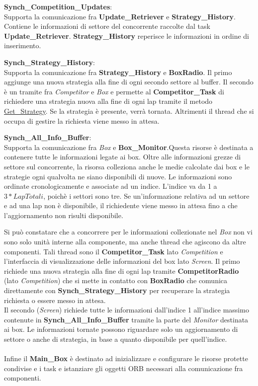 \begin{description}
\item{\textbf{Synch\_Competition\_Updates}}:\\
Supporta la comunicazione fra \textbf{Update\_Retriever} e \textbf{Strategy\_History}. Contiene le informazioni di settore del 
concorrente raccolte dal task \textbf{Update\_Retriever}. \textbf{Strategy\_History} reperisce le informazioni in ordine
di inserimento.
\item{\textbf{Synch\_Strategy\_History}}:\\
Supporta la comunicazione fra \textbf{Strategy\_History} e \textbf{BoxRadio}. Il primo aggiunge una nuova strategia alla fine di ogni secondo settore
al buffer. Il secondo \`{e} un tramite fra \emph{Competitor} e \emph{Box} e permette al \textbf{Competitor\_Task} di richiedere una strategia
nuova alla fine di ogni lap tramite il metodo \underline{Get\_Strategy}. Se la strategia \`{e} presente, verr\`{a} tornata. 
Altrimenti il thread che si occupa di gestire la richiesta
viene messo in attesa.
\item{\textbf{Synch\_All\_Info\_Buffer}}:\\
Supporta la comunicazione fra \emph{Box} e \textbf{Box\_Monitor}.Questa risorse \`{e} destinata a contenere tutte le informazioni legate ai box.
Oltre alle informazioni grezze di settore sul concorrente, la risorsa colleziona anche le medie calcolate
dai box e le strategie ogni qualvolta ne siano disponibili di nuove. Le informazioni sono ordinate cronologicamente e associate
ad un indice. L'indice va da 1 a $3 * Lap Totali$, poich\`{e} i settori sono tre. Se un'informazione relativa ad un settore e ad una lap non
\`{e} disponibile, il richiedente viene messo in attesa fino a che l'aggiornamento non risulti disponibile.
\end{description}
Si pu\`{o} constatare che a concorrere per le informazioni collezionate nel \emph{Box} non vi sono solo unit\`{a} interne alla componente, ma anche
thread che agiscono da altre componenti. Tali thread sono il \textbf{Competitor\_Task} lato \emph{Competition} e l'interfaccia di visualizzazione
delle informazioni del box lato \emph{Screen}. Il primo richiede una nuova strategia alla fine di ogni lap tramite \textbf{CompetitorRadio} (lato
\emph{Competition}) che si mette in contatto con \textbf{BoxRadio} che comunica direttamente con \textbf{Synch\_Strategy\_History} per recuperare
la strategia richiesta o essere messo in attesa.\\
Il secondo (\emph{Screen}) richiede tutte le informazioni dall'indice 1 all'indice massimo contenute in \textbf{Synch\_All\_Info\_Buffer} tramite
la parte del \emph{Monitor} destinata ai box. Le informazioni tornate possono riguardare solo un aggiornamento di settore o anche di strategia,
in base a quanto disponibile per quell'indice.\\
\\
Infine il \textbf{Main\_Box} \`{e} destinato ad inizializzare e configurare le risorse protette condivise e i task e istanziare gli oggetti ORB necessari 
alla comunicazione fra componenti.
\newpage
